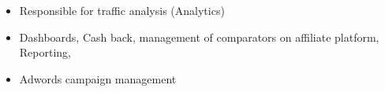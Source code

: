 \documentclass[10pt,a4paper]{altacv}
\begin{document}
\begin{itemize}
\item Responsible for traffic analysis (Analytics)
\item Dashboards, Cash back, management of comparators on affiliate platform, Reporting,
\item Adwords campaign management
\end{itemize}



%




\end{document}
